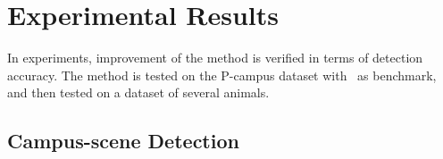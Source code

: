 \section{Experimental Results}
\label{ex4}
In experiments, improvement of the method is verified in terms of detection accuracy. The method is tested on the P-campus dataset with~\citep{ac9} as benchmark, and then tested on a dataset of several animals.
\subsection{ Campus-scene Detection }
\begin{figure}
\centering
{}
\end{figure}
